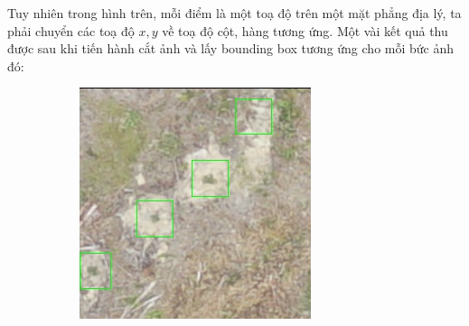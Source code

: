 \documentclass[a4paper, 12pt]{report}
\begin{document}
\begin{enumerate}[label= \textit{\alph*)}]
%
\newpage
Tuy nhiên trong hình trên, mỗi điểm là một toạ độ trên một mặt phẳng địa lý,  ta phải chuyển các toạ độ $x,y$ về toạ độ cột,  hàng tương ứng.  Một vài kết quả thu được sau khi tiến hành cắt ảnh và lấy bounding box tương ứng cho mỗi bức ảnh đó: 
\newpage
\begin{figure}[!h]
    \centering
    \begin{subfigure}[!h]{0.45\textwidth}
    \includegraphics[width=\linewidth]{Images/original/Img_RSKA003603_0_r000_c256}
        \label{fig:subfig1}
    \end{subfigure}%
    \quad
    \begin{subfigure}[!h]{0.45\textwidth}

\end{subfigure}
\end{figure}
\end{enumerate}
\end{document}
